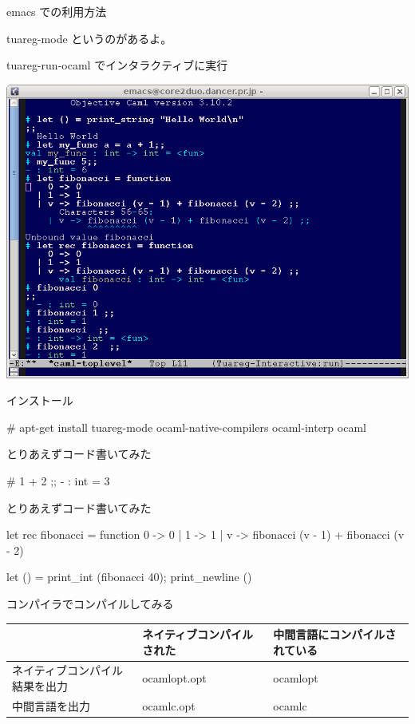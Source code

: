 \begin{frame}{emacs での利用方法}

tuareg-mode というのがあるよ。

tuareg-run-ocaml でインタラクティブに実行

\includegraphics[width=0.9\hsize]{image200904/tuareg-interactive.png}

\end{frame}

\begin{frame}[containsverbatim]{インストール}
\begin{commandline}
# apt-get install tuareg-mode ocaml-native-compilers ocaml-interp ocaml
\end{commandline}
\end{frame}

\begin{frame}[containsverbatim]{とりあえずコード書いてみた}
\begin{commandline}
# 1 + 2 ;;
- : int = 3
\end{commandline}
\end{frame}


\begin{frame}[containsverbatim]{とりあえずコード書いてみた}
\begin{commandline}
let rec fibonacci = function
    0 -> 0
  | 1 -> 1
  | v -> fibonacci (v - 1) + fibonacci (v - 2)

let () = print_int (fibonacci 40); print_newline ()
\end{commandline}
\end{frame}


\begin{frame}{コンパイラでコンパイルしてみる}

\begin{tabular}{|p{7em}|p{8em}|p{8em}|}
 \hline
 & ネイティブコンパイルされた & 中間言語にコンパイルされている\\
 \hline
ネイティブコンパイル結果を出力 &
ocamlopt.opt & ocamlopt\\
 \hline
中間言語を出力 &
ocamlc.opt & ocamlc \\
 \hline
\end{tabular}
\end{frame}

